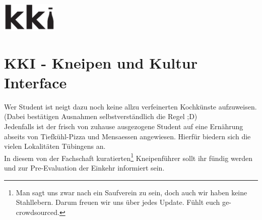 \newcommand{\no}     {\faIcon{times}}
\newcommand{\yes}    {\faIcon{check}}
\newcommand{\unknown}{\faIcon{question}}

\newcommand{\is}[1]{\ifcsvstrcmp{#1}{}{n.a.}{#1}}
\newcommand{\isUrl}[1]{\ifcsvstrcmp{#1}{}{n.a.}{\small\url{#1}}}

\newcommand{\has}[1]{\ifcsvstrcmp{#1}{0}{\no}{\ifcsvstrcmp{#1}{1}{\yes}{\unknown}}}

\newcommand{\features}[7]{
    \begin{tabular}{c|c|c|c|c|c|c}
        \renewcommand{\arraystretch}{2.5}
        \faIcon{utensils}       & \faIcon{beer}         & \faIcon{cocktail} & \faIcon{wifi}         & 
        \faIcon{shopping-bag}   & \faIcon{smoking}      & \faIcon{smoking-ban}              \\ \hline
        #1 & #2 & #3 & #4 & #5 & #6 & #7
    \end{tabular}
}

\newcommand{\kneipenCSV}{kki/dump.csv}

\centerline{\includegraphics[width=100px]{kki/kki-small.pdf}}

\section*{KKI - Kneipen und Kultur Interface}

Wer Student ist neigt dazu noch keine allzu verfeinerten Kochkünste aufzuweisen. (Dabei bestätigen Ausnahmen selbstverständlich die Regel ;D)\\
Jedenfalls ist der frisch von zuhause ausgezogene Student auf eine Ernährung abseits von Tiefkühl-Pizza und Mensaessen angewiesen. Hierfür biedern sich die vielen Lokalitäten Tübingens an.\\
In diesem von der Fachschaft kuratierten\footnote{Man sagt uns zwar nach ein Saufverein zu sein, doch auch wir haben keine Stahllebern. Darum freuen wir uns über jedes Update. Fühlt euch ge-crowdsourced.} Kneipenführer sollt ihr fündig werden und zur Pre-Evaluation der Einkehr informiert sein.

